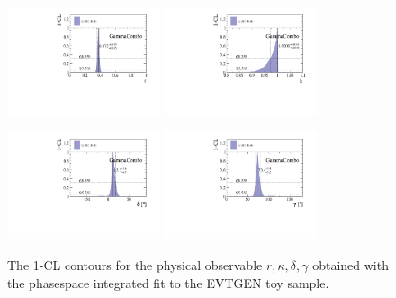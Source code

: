     
\begin{figure}[h]
	\centering
		\includegraphics[width=0.4\textwidth, height = !]{figs/GammaCombo/signal_DsKpipi_CPV_MC/cartesian_cp_coeff_r.pdf} 
		\includegraphics[width=0.4\textwidth, height = !]{figs/GammaCombo/signal_DsKpipi_CPV_MC/cartesian_cp_coeff_k.pdf} 
		
		\includegraphics[width=0.4\textwidth, height = !]{figs/GammaCombo/signal_DsKpipi_CPV_MC/cartesian_cp_coeff_d.pdf} 
		\includegraphics[width=0.4\textwidth, height = !]{figs/GammaCombo/signal_DsKpipi_CPV_MC/cartesian_cp_coeff_g.pdf} 
		\caption{The 1-CL contours for the physical observable $r,\kappa,\delta,\gamma$ obtained with the phasespace integrated fit to the \textsf{EVTGEN} toy sample. } 	
\end{figure}    

